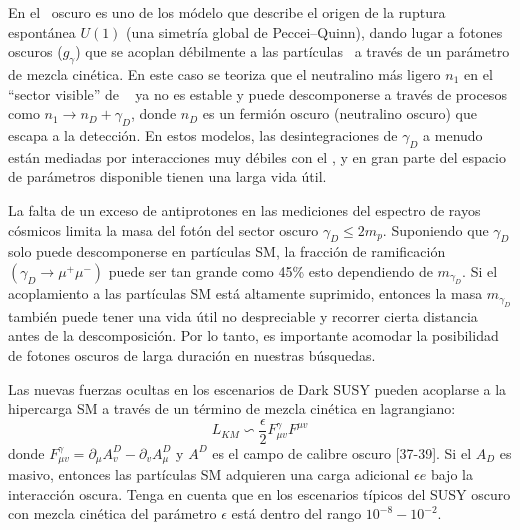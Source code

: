 
En el \SUSY ~oscuro es uno de los módelo que describe el origen de la ruptura espontánea $U(1)$ (una simetría global de Peccei–Quinn), dando lugar a fotones oscuros ($g_\gamma$) que se acoplan débilmente a las partículas \ME ~a través de un parámetro de mezcla cinética. En este caso se teoriza que el neutralino más ligero $n_1$ en el ``sector visible'' de \SUSY ~ ya no es estable y puede descomponerse a través de procesos como $n_1\longrightarrow  n_D + \gamma_D$, donde $n_D$ es un fermión oscuro (neutralino oscuro) que escapa a la detección. En estos modelos, las desintegraciones de $\gamma_D$ a menudo están mediadas por interacciones muy débiles con el \ME, y en gran parte del espacio de parámetros disponible tienen una larga vida útil. %

La falta de un exceso de antiprotones en las mediciones del espectro de rayos cósmicos limita la masa del fotón del sector oscuro $\gamma_D\leq 2m_p$. Suponiendo que $\gamma_D$ solo puede descomponerse en partículas SM, la fracción de ramificación $(\gamma_D\rightarrow \mu^+\mu^-)$ puede ser tan grande como 45\% esto dependiendo de $m_{\gamma_D}$. Si el acoplamiento a las partículas SM está altamente suprimido, entonces la masa $m_{\gamma_D}$ también puede tener una vida útil no despreciable y recorrer cierta distancia antes de la descomposición. Por lo tanto, es importante acomodar la posibilidad de fotones oscuros de larga duración en nuestras búsquedas.

Las nuevas fuerzas ocultas en los escenarios de Dark SUSY pueden acoplarse a la hipercarga SM a través de un término de mezcla cinética en lagrangiano:
\begin{equation}
\label{an-15-455:ec3}
L_{KM}\backsim \dfrac{\epsilon}{2} F_{\mu v}^{\gamma} F^{\mu v}
\end{equation}
donde $F_{\mu v}^{\gamma} = \partial_\mu A_v^{D} -\partial_v A_\mu^D$ y $A^D$ es el campo de calibre oscuro [37-39]. Si el $A_D$ es masivo, entonces las partículas SM adquieren una carga adicional $\epsilon e$ bajo la interacción oscura. Tenga en cuenta que en los escenarios típicos del SUSY oscuro con mezcla cinética del parámetro $\epsilon$ está dentro del rango $10^{-8}-10^{-2}$. 

